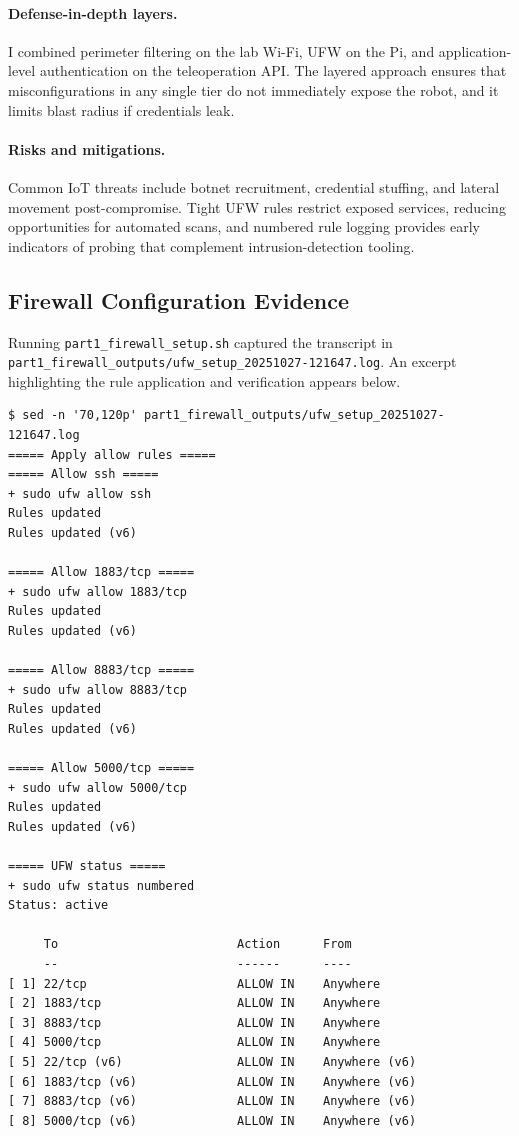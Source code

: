 \documentclass[11pt]{article}
\begin{document}
\paragraph{Defense-in-depth layers.} I combined perimeter filtering on the lab Wi-Fi, UFW on the Pi, and application-level authentication on the teleoperation API. The layered approach ensures that misconfigurations in any single tier do not immediately expose the robot, and it limits blast radius if credentials leak.

\paragraph{Risks and mitigations.} Common IoT threats include botnet recruitment, credential stuffing, and lateral movement post-compromise. Tight UFW rules restrict exposed services, reducing opportunities for automated scans, and numbered rule logging provides early indicators of probing that complement intrusion-detection tooling.

\subsection{Firewall Configuration Evidence}
Running \texttt{part1\_firewall\_setup.sh} captured the transcript in \texttt{part1\_firewall\_outputs/ufw\_setup\_20251027-121647.log}. An excerpt highlighting the rule application and verification appears below.

\begin{lstlisting}[caption={Excerpt from UFW configuration log}, label={lst:ufw-log}]
$ sed -n '70,120p' part1_firewall_outputs/ufw_setup_20251027-121647.log
===== Apply allow rules =====
===== Allow ssh =====
+ sudo ufw allow ssh
Rules updated
Rules updated (v6)

===== Allow 1883/tcp =====
+ sudo ufw allow 1883/tcp
Rules updated
Rules updated (v6)

===== Allow 8883/tcp =====
+ sudo ufw allow 8883/tcp
Rules updated
Rules updated (v6)

===== Allow 5000/tcp =====
+ sudo ufw allow 5000/tcp
Rules updated
Rules updated (v6)

===== UFW status =====
+ sudo ufw status numbered
Status: active

     To                         Action      From
     --                         ------      ----
[ 1] 22/tcp                     ALLOW IN    Anywhere
[ 2] 1883/tcp                   ALLOW IN    Anywhere
[ 3] 8883/tcp                   ALLOW IN    Anywhere
[ 4] 5000/tcp                   ALLOW IN    Anywhere
[ 5] 22/tcp (v6)                ALLOW IN    Anywhere (v6)
[ 6] 1883/tcp (v6)              ALLOW IN    Anywhere (v6)
[ 7] 8883/tcp (v6)              ALLOW IN    Anywhere (v6)
[ 8] 5000/tcp (v6)              ALLOW IN    Anywhere (v6)
\end{lstlisting}
\end{document}
